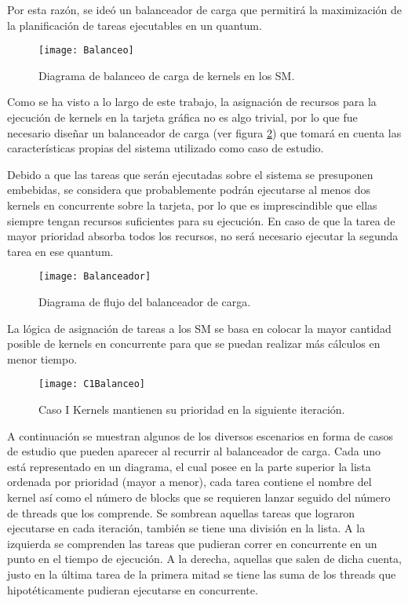 Por esta razón, se ideó un balanceador de carga que permitirá la maximización de la planificación de tareas ejecutables en un quantum.
\newline

        \begin{figure}[!]
      \centering
        \texttt{[image: Balanceo]}
        \caption{Diagrama de balanceo de carga de kernels en los SM.}
        \label{fig:Balanceo}
    \end{figure}
    
    Como se ha visto a lo largo de este trabajo, la asignación de recursos para la ejecución de kernels en la tarjeta gráfica no es algo trivial, por lo que fue necesario diseñar un balanceador de carga (ver figura \ref{fig:Balanceador}) que tomará en cuenta las características propias del sistema utilizado como caso de estudio.
    \newline
    
    Debido a que las tareas que serán ejecutadas sobre el sistema se presuponen embebidas, se considera que probablemente podrán ejecutarse al menos dos kernels en concurrente sobre la tarjeta, por lo que es imprescindible que ellas siempre tengan recursos suficientes para su ejecución. En caso de que la tarea de mayor prioridad absorba todos los recursos, no será necesario ejecutar la segunda tarea en ese quantum.
\newline

    \begin{figure}[!]
      \centering
        \texttt{[image: Balanceador]}
        \caption{Diagrama de flujo del balanceador de carga.}
        \label{fig:Balanceador}
    \end{figure}

La lógica de asignación de tareas a los SM se basa en colocar la mayor cantidad posible de kernels en concurrente para que se puedan realizar más cálculos en menor tiempo.
\newline

    \begin{figure}[!]
      \centering
        \texttt{[image: C1Balanceo]}
        \caption{Caso I Kernels mantienen su prioridad en la siguiente iteración.}
        \label{fig:C1Balanceo}
    \end{figure}

A continuación se muestran algunos de los diversos escenarios en forma de casos de estudio que pueden aparecer al recurrir al balanceador de carga. Cada uno está representado en un diagrama, el cual posee en la parte superior la lista ordenada por prioridad (mayor a menor), cada tarea contiene el nombre del kernel así como el número de blocks que se requieren lanzar seguido del número de threads que los comprende. Se sombrean aquellas tareas que lograron ejecutarse en cada iteración, también se tiene una división en la lista. A la izquierda se comprenden las tareas que pudieran correr en concurrente en un punto en el tiempo de ejecución. A la derecha, aquellas que salen de dicha cuenta, justo en la última tarea de la primera mitad se tiene las suma de los threads que hipotéticamente pudieran ejecutarse en concurrente.
\newline

